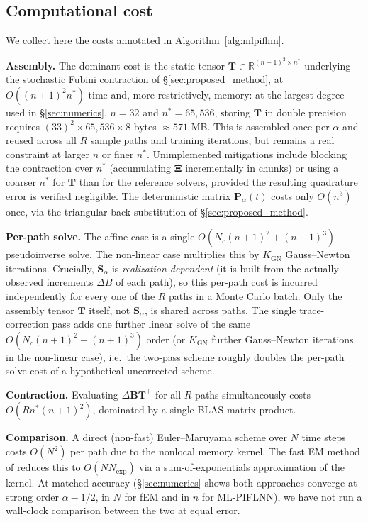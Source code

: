 \documentclass[11pt, a4paper]{article}
\theoremstyle{theoremstyle}
\theoremstyle{definitionstyle}
\begin{document}
\subsection{Computational cost}\label{sec:cost}
We collect here the costs annotated in Algorithm~\ref{alg:mlpiflnn}.

\textbf{Assembly.} The dominant cost is the static tensor $\mathbf T \in \mathbb R^{(n+1)^2 \times n^*}$ underlying the stochastic Fubini contraction of \S\ref{sec:proposed_method}, at $O((n+1)^2n^*)$ time and, more restrictively, memory: at the largest degree used in \S\ref{sec:numerics}, $n=32$ and $n^*=65{,}536$, storing $\mathbf T$ in double precision requires $(33)^2 \times 65{,}536 \times 8$ bytes $\approx 571$ MB. This is assembled once per $\alpha$ and reused across all $R$ sample paths and training iterations, but remains a real constraint at larger $n$ or finer $n^*$. Unimplemented mitigations include blocking the contraction over $n^*$ (accumulating $\boldsymbol\Xi$ incrementally in chunks) or using a coarser $n^*$ for $\mathbf T$ than for the reference solvers, provided the resulting quadrature error is verified negligible. The deterministic matrix $\mathbf P_\alpha(t)$ costs only $O(n^3)$ once, via the triangular back-substitution of \S\ref{sec:proposed_method}.

\textbf{Per-path solve.} The affine case is a single $O(N_c(n+1)^2+(n+1)^3)$ pseudoinverse solve. The non-linear case multiplies this by $K_{\mathrm{GN}}$ Gauss--Newton iterations. Crucially, $\mathbf S_\alpha$ is \emph{realization-dependent} (it is built from the actually-observed increments $\Delta B$ of each path), so this per-path cost is incurred independently for every one of the $R$ paths in a Monte Carlo batch. Only the assembly tensor $\mathbf T$ itself, not $\mathbf S_\alpha$, is shared across paths. The single trace-correction pass adds one further linear solve of the same $O(N_c(n+1)^2+(n+1)^3)$ order (or $K_{\mathrm{GN}}$ further Gauss--Newton iterations in the non-linear case), i.e.\ the two-pass scheme roughly doubles the per-path solve cost of a hypothetical uncorrected scheme.

\textbf{Contraction.} Evaluating $\Delta\mathbf B\mathbf T^\top$ for all $R$ paths simultaneously costs $O(Rn^*(n+1)^2)$, dominated by a single BLAS matrix product.

\textbf{Comparison.} A direct (non-fast) Euler--Maruyama scheme over $N$ time steps costs $O(N^2)$ per path due to the nonlocal memory kernel. The fast EM method of \cite{zhang2023fast} reduces this to $O(NN_{\exp})$ via a sum-of-exponentials approximation of the kernel. At matched accuracy (\S\ref{sec:numerics} shows both approaches converge at strong order $\alpha-1/2$, in $N$ for fEM and in $n$ for ML-PIFLNN), we have not run a wall-clock comparison between the two at equal error.
\end{document}
